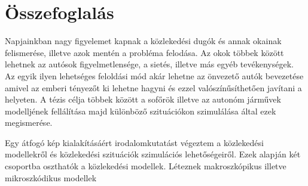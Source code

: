 \chapter*{Összefoglalás}
Napjainkban nagy figyelemet kapnak a közlekedési dugók és annak okainak felismerése, illetve azok mentén a probléma felodása. Az okok többek között lehetnek az autósok figyelmetlensége, a sietés, illetve más egyéb tevékenységek. Az egyik ilyen lehetséges feloldási mód akár lehetne az önvezető autók bevezetése amivel az emberi tényezőt ki lehetne hagyni és ezzel valószínűsíthetően javítani a helyeten. A tézis célja többek között a sofőrök illetve az autonóm járművek modelljének fellálítása majd különböző szituációkon szimulálása által ezek megismerése.

Egy átfogó kép kialakításáért irodalomkutatást végeztem a közlekedési modellekről és közlekedési szituációk szimulációs lehetőségeiről. Ezek alapján két csoportba oszthatók a közlekedési modellek. Léteznek makroszkópikus illetve mikroszkódikus modellek

